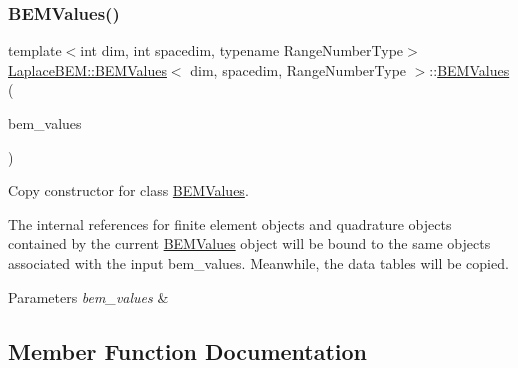 \subsubsection{\texorpdfstring{B\+E\+M\+Values()}{BEMValues()}\hspace{0.1cm}{\footnotesize\ttfamily [4/4]}}
{\footnotesize\ttfamily template$<$int dim, int spacedim, typename Range\+Number\+Type$>$ \\
\hyperlink{classLaplaceBEM_1_1BEMValues}{Laplace\+B\+E\+M\+::\+B\+E\+M\+Values}$<$ dim, spacedim, Range\+Number\+Type $>$\+::\hyperlink{classLaplaceBEM_1_1BEMValues}{B\+E\+M\+Values} (\begin{DoxyParamCaption}\item[{const \hyperlink{classLaplaceBEM_1_1BEMValues}{B\+E\+M\+Values}$<$ dim, spacedim, Range\+Number\+Type $>$ \&}]{bem\+\_\+values }\end{DoxyParamCaption})}

Copy constructor for class {\ttfamily \hyperlink{classLaplaceBEM_1_1BEMValues}{B\+E\+M\+Values}}.


\begin{DoxyDescription}
\item[Note ]The internal references for finite element objects and quadrature objects contained by the current {\ttfamily \hyperlink{classLaplaceBEM_1_1BEMValues}{B\+E\+M\+Values}} object will be bound to the same objects associated with the input {\ttfamily bem\+\_\+values}. Meanwhile, the data tables will be copied. 
\end{DoxyDescription}


\begin{DoxyParams}{Parameters}
{\em bem\+\_\+values} & \\
\hline
\end{DoxyParams}


\subsection{Member Function Documentation}
\mbox{\label{classLaplaceBEM_1_1BEMValues_a5383d5eb891f8cd742584e95aad976c8}} 
